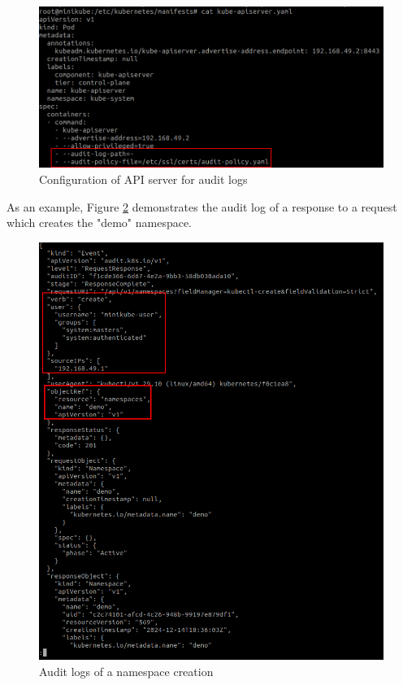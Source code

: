 \documentclass[a4paper,11pt,openright,BCOR=15mm]{scrbook}
\begin{document}
\begin{figure}[h!]
	\centering
	\includegraphics[scale=0.5]{figs/api-config-audit.png}
	\caption{Configuration of API server for audit logs}
	\label{fig:auditconf}
\end{figure}

As an example, Figure \ref{fig:audit-namespace} demonstrates the audit log of a response to a request which creates the "demo" namespace.

\begin{figure}[h!]
	\centering
	\includegraphics[scale=0.4]{figs/audit-namespace-create.png}
	\caption{Audit logs of a namespace creation}
	\label{fig:audit-namespace}
\end{figure}
\end{document}
